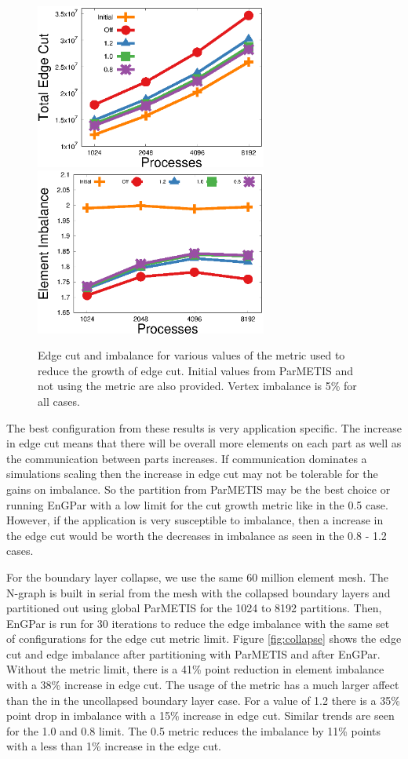 \documentclass[conference]{IEEEtran}
\begin{document}
\begin{figure}[!ht]
  \centering
  \includegraphics[width=3in]{plots/aepw_edgeCut_collapse_results/ecut_v_cores}
  \includegraphics[width=3in]{plots/aepw_edgeCut_collapse_results/eimb_v_cores}
  \caption{Edge cut and imbalance for various values of the metric used to reduce the growth of edge cut. Initial values from ParMETIS and not using the metric are also provided. Vertex imbalance is 5\% for all cases.}
  \label{fig:metric}
\end{figure}

The best configuration from these results is very application specific. The increase in
edge cut means that there will be overall more elements on each part as well as the communication
between parts increases. If communication dominates a simulations scaling then the increase in
edge cut may not be tolerable for the gains on imbalance. So the partition from ParMETIS may
be the best choice or running EnGPar with a low limit for the cut growth metric like in the
0.5 case. However, if the application is very susceptible to imbalance, then a increase in the
edge cut would be worth the decreases in imbalance as seen in the 0.8 - 1.2 cases.

For the boundary layer collapse, we use the same 60 million element mesh. The N-graph is
built in serial from the mesh with the collapsed boundary layers and partitioned
out using global ParMETIS for the 1024 to 8192 partitions.
Then, EnGPar is run for 30 iterations to reduce the edge imbalance with the same set of
configurations for the edge cut metric limit. Figure \ref{fig:collapse}
shows the edge cut and edge imbalance after partitioning with
ParMETIS and after EnGPar. Without the metric limit, there is a 41\% point reduction in
element imbalance with a 38\% increase in edge cut. The usage of the metric has a much larger
affect than the in the uncollapsed boundary layer case. For a value of 1.2 there is a 35\% point
drop in imbalance with a 15\% increase in edge cut. Similar trends are seen for the 1.0 and 0.8
limit. The 0.5 metric reduces the imbalance by 11\% points with a less than 1\% increase in the
edge cut.
\end{document}
